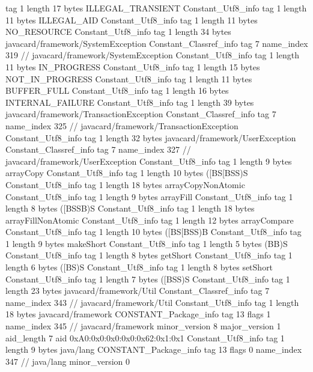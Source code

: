 {{{			tag	1
			length	17
			bytes	ILLEGAL_TRANSIENT
		}
		Constant_Utf8_info {
			tag	1
			length	11
			bytes	ILLEGAL_AID
		}
		Constant_Utf8_info {
			tag	1
			length	11
			bytes	NO_RESOURCE
		}
		Constant_Utf8_info {
			tag	1
			length	34
			bytes	javacard/framework/SystemException
		}
		Constant_Classref_info {
			tag	7
			name_index	319		// javacard/framework/SystemException
		}
		Constant_Utf8_info {
			tag	1
			length	11
			bytes	IN_PROGRESS
		}
		Constant_Utf8_info {
			tag	1
			length	15
			bytes	NOT_IN_PROGRESS
		}
		Constant_Utf8_info {
			tag	1
			length	11
			bytes	BUFFER_FULL
		}
		Constant_Utf8_info {
			tag	1
			length	16
			bytes	INTERNAL_FAILURE
		}
		Constant_Utf8_info {
			tag	1
			length	39
			bytes	javacard/framework/TransactionException
		}
		Constant_Classref_info {
			tag	7
			name_index	325		// javacard/framework/TransactionException
		}
		Constant_Utf8_info {
			tag	1
			length	32
			bytes	javacard/framework/UserException
		}
		Constant_Classref_info {
			tag	7
			name_index	327		// javacard/framework/UserException
		}
		Constant_Utf8_info {
			tag	1
			length	9
			bytes	arrayCopy
		}
		Constant_Utf8_info {
			tag	1
			length	10
			bytes	([BS[BSS)S
		}
		Constant_Utf8_info {
			tag	1
			length	18
			bytes	arrayCopyNonAtomic
		}
		Constant_Utf8_info {
			tag	1
			length	9
			bytes	arrayFill
		}
		Constant_Utf8_info {
			tag	1
			length	8
			bytes	([BSSB)S
		}
		Constant_Utf8_info {
			tag	1
			length	18
			bytes	arrayFillNonAtomic
		}
		Constant_Utf8_info {
			tag	1
			length	12
			bytes	arrayCompare
		}
		Constant_Utf8_info {
			tag	1
			length	10
			bytes	([BS[BSS)B
		}
		Constant_Utf8_info {
			tag	1
			length	9
			bytes	makeShort
		}
		Constant_Utf8_info {
			tag	1
			length	5
			bytes	(BB)S
		}
		Constant_Utf8_info {
			tag	1
			length	8
			bytes	getShort
		}
		Constant_Utf8_info {
			tag	1
			length	6
			bytes	([BS)S
		}
		Constant_Utf8_info {
			tag	1
			length	8
			bytes	setShort
		}
		Constant_Utf8_info {
			tag	1
			length	7
			bytes	([BSS)S
		}
		Constant_Utf8_info {
			tag	1
			length	23
			bytes	javacard/framework/Util
		}
		Constant_Classref_info {
			tag	7
			name_index	343		// javacard/framework/Util
		}
		Constant_Utf8_info {
			tag	1
			length	18
			bytes	javacard/framework
		}
		CONSTANT_Package_info {
			tag	13
			flags	1
			name_index	345		// javacard/framework
			minor_version	8
			major_version	1
			aid_length	7
			aid	0xA0:0x0:0x0:0x0:0x62:0x1:0x1
		}
		Constant_Utf8_info {
			tag	1
			length	9
			bytes	java/lang
		}
		CONSTANT_Package_info {
			tag	13
			flags	0
			name_index	347		// java/lang
			minor_version	0
}}}
